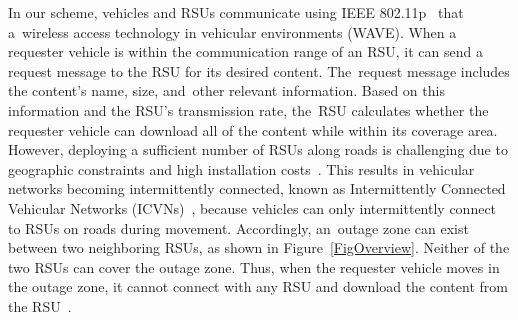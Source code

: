 \documentclass[electronics,aricle,accept,pdftex,moreauthors]{Definitions/mdpi}
\begin{document}
In our scheme, vehicles and RSUs communicate using IEEE 802.11p~\cite{Wave} that
 a~wireless access technology in vehicular environments (WAVE). When a requester vehicle is within the communication range of an RSU, it can send a request message to the RSU for its desired content. The~request message includes the content's name, size, and~other relevant information. Based on this information and the RSU's transmission rate, the~RSU calculates whether the requester vehicle can download all of the content while within its coverage area.
However, deploying a sufficient number of RSUs along roads is challenging due to geographic constraints and high installation costs~\cite{Kim2017}. This results in vehicular networks becoming intermittently connected, known as Intermittently Connected Vehicular Networks (ICVNs)~\cite{Suthaputchakun2018}, because vehicles can only intermittently connect to RSUs on roads during movement. Accordingly, an~outage zone can exist between two neighboring RSUs, as shown in Figure~\ref{FigOverview}. Neither of the two RSUs can cover the outage zone. Thus, when the requester vehicle moves in the outage zone, it cannot connect with any RSU and download the content from the RSU~\cite{Bang2020}.
\end{document}
